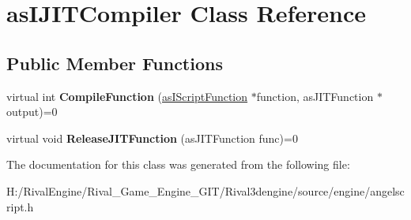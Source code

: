 \hypertarget{classas_i_j_i_t_compiler}{}\section{as\+I\+J\+I\+T\+Compiler Class Reference}
\label{classas_i_j_i_t_compiler}
\subsection*{Public Member Functions}
\begin{DoxyCompactItemize}
\item 
\mbox{\label{classas_i_j_i_t_compiler_aa6270727e61d8708d651a0f5faada695}} 
virtual int {\bfseries Compile\+Function} (\hyperlink{classas_i_script_function}{as\+I\+Script\+Function} $\ast$function, as\+J\+I\+T\+Function $\ast$output)=0
\item 
\mbox{\label{classas_i_j_i_t_compiler_afbf9390868269c9224df85d49aabd451}} 
virtual void {\bfseries Release\+J\+I\+T\+Function} (as\+J\+I\+T\+Function func)=0
\end{DoxyCompactItemize}


The documentation for this class was generated from the following file\+:\begin{DoxyCompactItemize}
\item 
H\+:/\+Rival\+Engine/\+Rival\+\_\+\+Game\+\_\+\+Engine\+\_\+\+G\+I\+T/\+Rival3dengine/source/engine/angelscript.\+h\end{DoxyCompactItemize}
